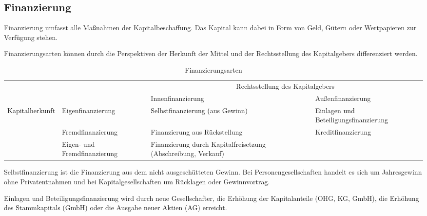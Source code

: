 \subsection{Finanzierung}

Finanzierung umfasst alle Maßnahmen der Kapitalbeschaffung. Das Kapital kann dabei in Form von Geld, Gütern oder Wertpapieren zur Verfügung stehen.

Finanzierungsarten können durch die Perspektiven der Herkunft der Mittel und der Rechtsstellung des Kapitalgebers differenziert werden.

\begin{table}
    [H]
    \centering
    \begin{tabularx}{\textwidth}{|l|X|X|X|}
        \cline{3-4}
        \multicolumn{2}{c|}{}            & \multicolumn{2}{c|}{Rechtsstellung des Kapitalgebers}                                                                                                         \\
        \cline{3-4}
        \multicolumn{2}{c|}{}            & Innenfinanzierung                                     & Außenfinanzierung                                                                                     \\
        \hline
        \multirow{3}{*}{Kapitalherkunft} & Eigenfinanzierung                                     & Selbstfinanzierung (aus Gewinn)                               & Einlagen und Beteiligungsfinanzierung \\
        \cline{2-4}
                                         & Fremdfinanzierung                                     & Finanzierung aus Rückstellung                                 & Kreditfinanzierung                    \\
        \cline{2-4}
                                         & Eigen- und Fremdfinanzierung                          & Finanzierung durch Kapitalfreisetzung (Abschreibung, Verkauf) & \multicolumn{1}{c}{}                  \\
        \cline{1-3}
    \end{tabularx}
    \caption{Finanzierungsarten}
\end{table}

Selbstfinanzierung ist die Finanzierung aus dem nicht ausgeschütteten Gewinn. Bei Personengesellschaften handelt es sich um Jahresgewinn ohne Privatentnahmen und bei Kapitalgesellschaften um Rücklagen oder Gewinnvortrag.

Einlagen und Beteiligungsfinanzierung wird durch neue Gesellschafter, die Erhöhung der Kapitalanteile (OHG, KG, GmbH), die Erhöhung des Stammkapitals (GmbH) oder die Ausgabe neuer Aktien (AG) erreicht.

